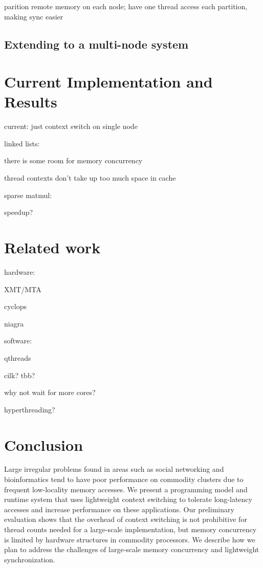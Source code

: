 \documentclass{acm_proc_article-sp}
\begin{document}
parition remote memory on each node; have one thread access each
partition, making sync easier

\subsection{Extending to a multi-node system}


\section{Current Implementation and Results}

current: just context switch on single node


linked lists:

there is some room for memory concurrency

thread contexts don't take up too much space in cache

sparse matmul:

speedup?






\section{Related work}


hardware:

XMT/MTA

cyclops

niagra

software:

qthreads

cilk? tbb?

why not wait for more cores?

hyperthreading?



\section{Conclusion}

Large irregular problems found in areas such as social networking and
bioinformatics tend to have poor performance on commodity clusters due
to frequent low-locality memory accesses. We present a programming
model and runtime system that uses lightweight context switching to
tolerate long-latency accesses and increase performance on these
applications. Our preliminary evaluation shows that the overhead of
context switching is not prohibitive for thread counts needed for a
large-scale implementation, but memory concurrency is limited by
hardware structures in commodity processors. We describe how we plan
to address the challenges of large-scale memory concurrency and
lightweight synchronization.




\end{document}
